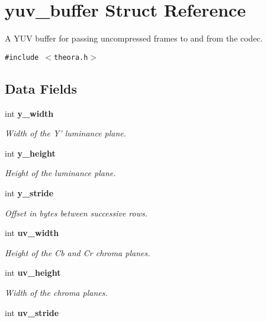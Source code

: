 \section{yuv\_\-buffer Struct Reference}
\label{structyuv__buffer}
A YUV buffer for passing uncompressed frames to and from the codec.  


{\tt \#include $<$theora.h$>$}

\subsection*{Data Fields}
\begin{CompactItemize}
\item 
int {\bf y\_\-width}\label{structyuv__buffer_1f6d315bbeac5c143e675bff7606d9fa}

\begin{CompactList}\small\item\em Width of the Y' luminance plane. \item\end{CompactList}\item 
int {\bf y\_\-height}\label{structyuv__buffer_c8af965f6efae51897a2f1690cbaf103}

\begin{CompactList}\small\item\em Height of the luminance plane. \item\end{CompactList}\item 
int {\bf y\_\-stride}\label{structyuv__buffer_1b556662ed0bc7866ee78e32687c0eea}

\begin{CompactList}\small\item\em Offset in bytes between successive rows. \item\end{CompactList}\item 
int {\bf uv\_\-width}\label{structyuv__buffer_464b8795e6f91436204710f1c3f957b9}

\begin{CompactList}\small\item\em Height of the Cb and Cr chroma planes. \item\end{CompactList}\item 
int {\bf uv\_\-height}\label{structyuv__buffer_e000b9579ca67e7aa3e40755517285cc}

\begin{CompactList}\small\item\em Width of the chroma planes. \item\end{CompactList}\item 
int {\bf uv\_\-stride}\label{structyuv__buffer_8501c16afe7c891ebc3aa4572f2a4ef3}


\end{CompactItemize}
